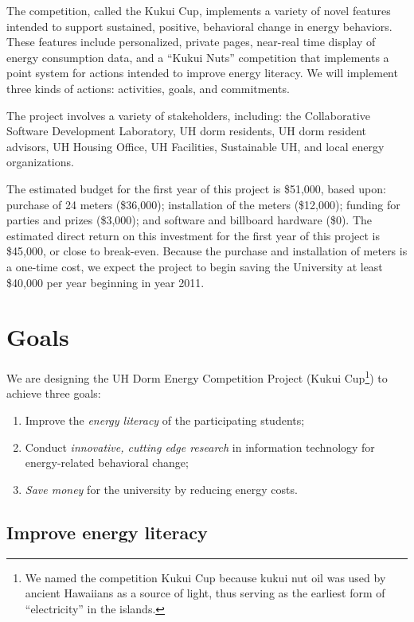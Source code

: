 \documentclass[11pt]{article}
\begin{document}
The competition, called the Kukui Cup, implements a variety of novel
features intended to support sustained, positive, behavioral change in
energy behaviors.  These features include personalized, private pages,
near-real time display of energy consumption data, and a ``Kukui Nuts''
competition that implements a point system for actions intended to improve
energy literacy.  We will implement three kinds of actions: activities,
goals, and commitments.

The project involves a variety of stakeholders, including: the
Collaborative Software Development Laboratory, UH dorm residents, UH dorm
resident advisors, UH Housing Office, UH Facilities, Sustainable UH, and
local energy organizations.

The estimated budget for the first year of this project is \$51,000, based
upon: purchase of 24 meters (\$36,000); installation of the meters
(\$12,000); funding for parties and prizes (\$3,000); and software and
billboard hardware (\$0).  The estimated direct return on this investment
for the first year of this project is \$45,000, or close to break-even.
Because the purchase and installation of meters is a one-time cost, we
expect the project to begin saving the University at least \$40,000 per
year beginning in year 2011.  










\newpage
\section{Goals}

We are designing the UH Dorm Energy Competition Project (Kukui
Cup\footnote{We named the competition Kukui Cup because kukui nut oil was used by ancient Hawaiians as a source of light,
  thus serving as the earliest form of ``electricity'' in the islands.}) to achieve three goals:
\begin{enumerate}
\item Improve the {\em energy literacy} of the participating students;
\item Conduct {\em innovative, cutting edge research} in information technology for
  energy-related behavioral change;
\item {\em Save money} for the university by reducing energy costs.
\end{enumerate}

\subsection{Improve energy literacy}
\end{document}
